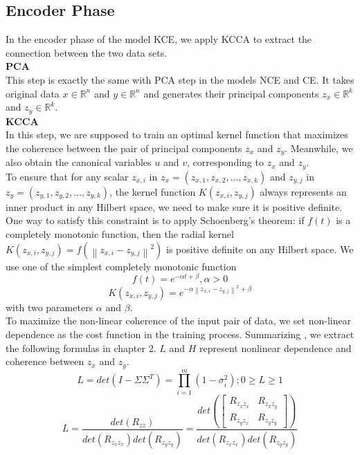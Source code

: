 \documentclass[12pt]{report} %
\newcommand{\norm}[1]{\left\lVert #1 \right\rVert}
\begin{document}
\subsection{Encoder Phase}
In the encoder phase of the model KCE, we apply KCCA to extract the connection between the two data sets. \\

\textbf{PCA}\\
This step is exactly the same with PCA step in the models NCE and CE. It takes original data $x\in \mathbb{R}^{n}$ and $y\in \mathbb{R}^{n}$ and generates their principal components $z_x\in \mathbb{R}^{k}$ and $z_y\in \mathbb{R}^{k}$.\\

\textbf{KCCA}\\
In this step, we are supposed to train an optimal kernel function that maximizes the coherence between the pair of principal components $z_x$ and $z_y$. Meanwhile, we also obtain the canonical variables $u$ and $v$, corresponding to $z_x$ and $z_y$. \\
To ensure that for any scalar \(z_{x,i}\) in \(z_x=(z_{x,1},z_{x,2},...,z_{x,k})\) and \(z_{y,j}\) in \(z_y=(z_{y,1},z_{y,2},...,z_{y,k})\), the kernel function $K(z_{x,i},z_{y,j})$ always represents an inner product in any Hilbert space, we need to make sure it is positive definite. One way to satisfy this constraint is to apply Schoenberg's theorem: if \(f(t)\) is a completely monotonic function, then the radial kernel $K(z_{x,i},z_{y,j})=f(\norm{z_{x,i}-z_{y,j}}^2)$ is positive definite on any Hilbert space. We use one of the simplest completely monotonic function
\begin{equation}
f(t)=e^{-\alpha t + \beta}, \alpha>0
\end{equation}
\begin{equation}
K(z_{x,i},z_{y,j})=e^{-\alpha \norm{z_{x,i}-z_{y,j}}^2 + \beta}
\end{equation}
with two parameters $\alpha$ and $\beta$.\\
To maximize the non-linear coherence of the input pair of data, we set non-linear dependence as the cost function in the training process. Summarizing \cite{ECCA}, we extract the following formulas in chapter 2. $L$ and $H$ represent nonlinear dependence and coherence between $z_x$ and $z_y$.
\begin{equation}
L=det(I-\Sigma\Sigma^T)=\prod_{i=1}^{m}(1-\sigma_i^2);0 \geq L \geq 1
\end{equation}
\begin{equation}
L=\frac{det(R_{zz})}
{det(R_{z_{x}z_{x}})det(R_{z_{y}z_{y}})}=\frac{det(\begin{bmatrix}
	R_{z_{x}z_{x}} & R_{z_{x}z_{y}} \\
	R_{z_{y}z_{x}} & R_{z_{y}z_{y}}
	\end{bmatrix})}
{det(R_{z_{x}z_{x}})det(R_{z_{y}z_{y}})}
\end{equation}
\end{document}
